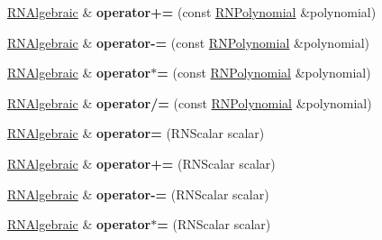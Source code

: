 \begin{DoxyCompactItemize}
\item 
\hyperlink{class_r_n_algebraic}{R\+N\+Algebraic} \& {\bfseries operator+=} (const \hyperlink{class_r_n_polynomial}{R\+N\+Polynomial} \&polynomial)\hypertarget{class_r_n_algebraic_aaee35d187cb6d34c476992e1250205a9}{}\label{class_r_n_algebraic_aaee35d187cb6d34c476992e1250205a9}

\item 
\hyperlink{class_r_n_algebraic}{R\+N\+Algebraic} \& {\bfseries operator-\/=} (const \hyperlink{class_r_n_polynomial}{R\+N\+Polynomial} \&polynomial)\hypertarget{class_r_n_algebraic_aaeabad5ab5228636efaa0533140af2d6}{}\label{class_r_n_algebraic_aaeabad5ab5228636efaa0533140af2d6}

\item 
\hyperlink{class_r_n_algebraic}{R\+N\+Algebraic} \& {\bfseries operator$\ast$=} (const \hyperlink{class_r_n_polynomial}{R\+N\+Polynomial} \&polynomial)\hypertarget{class_r_n_algebraic_a06d5dd6b44e450512e714c3436bba433}{}\label{class_r_n_algebraic_a06d5dd6b44e450512e714c3436bba433}

\item 
\hyperlink{class_r_n_algebraic}{R\+N\+Algebraic} \& {\bfseries operator/=} (const \hyperlink{class_r_n_polynomial}{R\+N\+Polynomial} \&polynomial)\hypertarget{class_r_n_algebraic_a1cd65b13be21b938adc249a4502d38e3}{}\label{class_r_n_algebraic_a1cd65b13be21b938adc249a4502d38e3}

\item 
\hyperlink{class_r_n_algebraic}{R\+N\+Algebraic} \& {\bfseries operator=} (R\+N\+Scalar scalar)\hypertarget{class_r_n_algebraic_afa602c51f5ff793f84684d328387777c}{}\label{class_r_n_algebraic_afa602c51f5ff793f84684d328387777c}

\item 
\hyperlink{class_r_n_algebraic}{R\+N\+Algebraic} \& {\bfseries operator+=} (R\+N\+Scalar scalar)\hypertarget{class_r_n_algebraic_aa49f73e5090e2c8e24389232029e97ce}{}\label{class_r_n_algebraic_aa49f73e5090e2c8e24389232029e97ce}

\item 
\hyperlink{class_r_n_algebraic}{R\+N\+Algebraic} \& {\bfseries operator-\/=} (R\+N\+Scalar scalar)\hypertarget{class_r_n_algebraic_add45ffb332fcbbb6bed8d7def11f427b}{}\label{class_r_n_algebraic_add45ffb332fcbbb6bed8d7def11f427b}

\item 
\hyperlink{class_r_n_algebraic}{R\+N\+Algebraic} \& {\bfseries operator$\ast$=} (R\+N\+Scalar scalar)\hypertarget{class_r_n_algebraic_a7de7d361e2be31e7c2c8d3120385c5dc}{}\label{class_r_n_algebraic_a7de7d361e2be31e7c2c8d3120385c5dc}


\end{DoxyCompactItemize}
